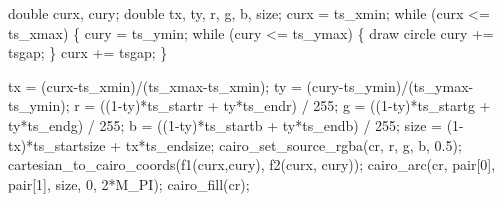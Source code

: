 \documentclass{article}%
\begin{document}
\nwenddocs{}\endmoddef\nwstartdeflinemarkup\nwenddeflinemarkup
double curx, cury;
double tx, ty, r, g, b, size;
curx = ts_xmin;
while (curx <= ts_xmax) \{
        cury = ts_ymin;
        while (cury <= ts_ymax) \{
                \LA{}draw circle\RA{}
                cury += tsgap;
        \}
        curx += tsgap;
\}

\nwendcode{}\endmoddef\nwstartdeflinemarkup\nwenddeflinemarkup
tx = (curx-ts_xmin)/(ts_xmax-ts_xmin);
ty = (cury-ts_ymin)/(ts_ymax-ts_ymin);
r = ((1-ty)*ts_startr + ty*ts_endr) / 255;
g = ((1-ty)*ts_startg + ty*ts_endg) / 255;
b = ((1-ty)*ts_startb + ty*ts_endb) / 255;
size = (1-tx)*ts_startsize + tx*ts_endsize;
cairo_set_source_rgba(cr, r, g, b, 0.5);
cartesian_to_cairo_coords(f1(curx,cury), f2(curx, cury));
cairo_arc(cr, pair[0], pair[1], size, 0, 2*M_PI);
cairo_fill(cr);

\nwendcode{}
\end{document}
